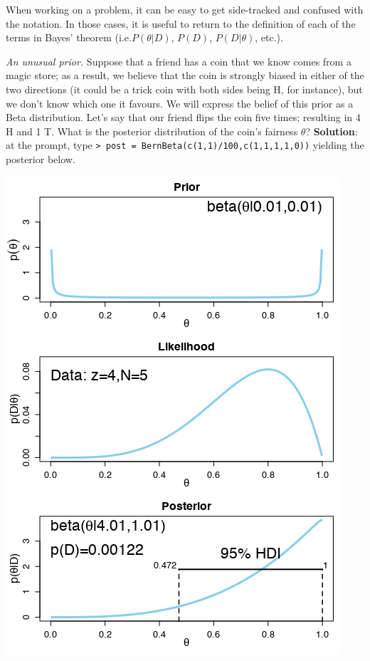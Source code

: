 \noindent When working on a problem, it can be easy to get side-tracked and confused with the notation. In those cases, it is useful to return to the definition of each of the terms in Bayes' theorem (i.e.\@ $P(\theta|D)$, $P(D)$, $P(D|\theta)$, etc.).
\begin{Example} \textit{An unusual prior.} \label{Ex:unusualprior}
Suppose that a friend has a coin that we know comes from a magic store; as a result, we believe that the coin is strongly biased in either of the two directions (it could be a trick coin with both sides being H, for instance), but we don't know which one it favours. We will express the belief of this prior as a Beta distribution. Let's say that our friend flips the coin five times; resulting in 4 H and 1 T. What is the posterior distribution of the coin's fairness $\theta$? \newl 
\textbf{Solution}: at the prompt, type \newl \small \texttt{> post = BernBeta(c(1,1)/100,c(1,1,1,1,0))}\normalsize\newl 
 yielding the posterior below.  
\begin{center}
\includegraphics[width=\linewidth]{Images/example52.png}

\end{center}
\end{Example}
